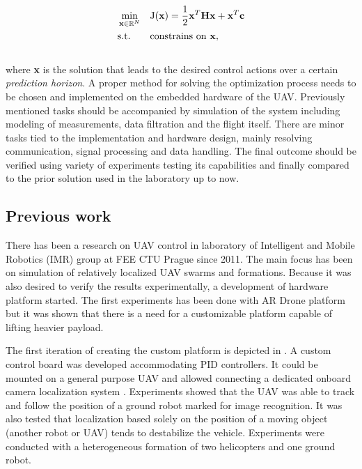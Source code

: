 \begin{equation}
\label{eq:qmpc_intro}
\begin{aligned}
& \min_{\textbf{x} \in \mathbb{R}^{N}}
& & \mathrm{J}(\textbf{x}) = \frac{1}{2}\textbf{x}^T\textbf{H}\textbf{x} + \textbf{x}^T\textbf{c}\\
& \text{s.t.}
& & \text{constrains on \textbf{x}},
\end{aligned}
\end{equation}
\\
where \textbf{x} is the solution that leads to the desired control actions over a certain \emph{prediction horizon}. A proper method for solving the optimization process needs to be chosen and implemented on the embedded hardware of the UAV. Previously mentioned tasks should be accompanied by simulation of the system including modeling of measurements, data filtration and the flight itself. There are minor tasks tied to the implementation and hardware design, mainly resolving communication, signal processing and data handling. The final outcome should be verified using variety of experiments testing its capabilities and finally compared to the prior solution used in the laboratory up to now.

\subsection{Previous work}
\label{cap:prior_work}

There has been a research on UAV control in laboratory of Intelligent and Mobile Robotics (IMR) group at FEE CTU Prague since 2011. The main focus has been on simulation of relatively localized UAV swarms and formations. Because it was also desired to verify the results experimentally, a development of hardware platform started. The first experiments has been done with AR Drone platform \citep{kranik2012drone} but it was shown that there is a need for a customizable platform capable of lifting heavier payload.

The first iteration of creating the custom platform is depicted in \citep{baca2013}. A custom control board was developed accommodating PID controllers. It could be mounted on a general purpose UAV and allowed connecting a dedicated onboard camera localization system \citep{faigl2013low}. Experiments showed that the UAV was able to track and follow the position of a ground robot marked for image recognition. It was also tested that localization based solely on the position of a moving object (another robot or UAV) tends to destabilize the vehicle. Experiments were conducted with a heterogeneous formation of two helicopters and one ground robot.

